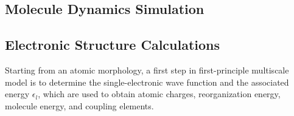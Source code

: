\documentclass[letterpaper,12pt]{article}
\begin{document}
\subsection{Molecule Dynamics Simulation}

\subsection{Electronic Structure Calculations} 
Starting from an atomic morphology, a first step in first-principle multiscale model is to determine the single-electronic wave function and the associated energy $\epsilon_l$, which are used to obtain atomic charges, reorganization energy, molecule energy, and coupling elements.
\end{document}
